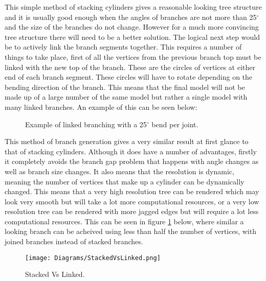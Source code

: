 \noindent
This simple method of stacking cylinders gives a reasonable looking tree structure and it is usually good enough when the angles of branches are not more than 25$^{\circ}$ and the size of the branches do not change. However for a much more convincing tree structure there will need to be a better solution. The logical next step would be to actively link the branch segments together. This requires a number of things to take place, first of all the vertices from the previous branch top must be linked with the new top of the branch. These are the circles of vertices at either end of each branch segment. These circles will have to rotate depending on the bending direction of the branch. This means that the final model will not be made up of a large number of the same model but rather a single model with many linked branches. An example of this can be seen below:

\begin{figure}[htbp]
	{\centering
		\vspace{7px}
		\setlength{\fboxrule}{1pt}
		\caption{Example of linked branching with a 25$^{\circ}$ bend per joint.}
	}
\end{figure}
\FloatBarrier

\noindent
This method of branch generation gives a very similar result at first glance to that of stacking cylinders. Although it does have a number of advantages, firstly it completely avoids the branch gap problem that happens with angle changes as well as branch size changes. It also means that the resolution is dynamic, meaning the number of vertices that make up a cylinder can be dynamically changed. This means that a very high resolution tree can be rendered which may look very smooth but will take a lot more computational resources, or a very low resolution tree can be rendered with more jagged edges but will require a lot less computational resources. This can be seen in figure \ref{stackedvslinked} below, where similar a looking branch can be acheived using less than half the number of vertices, with joined branches instead of stacked branches.

\begin{figure}[htbp]
	{\centering
		\vspace{7px}
		\texttt{[image: Diagrams/StackedVsLinked.png]}\label{stackedvslinked}
		\caption{Stacked Vs Linked.}
	}
\end{figure}
\FloatBarrier



